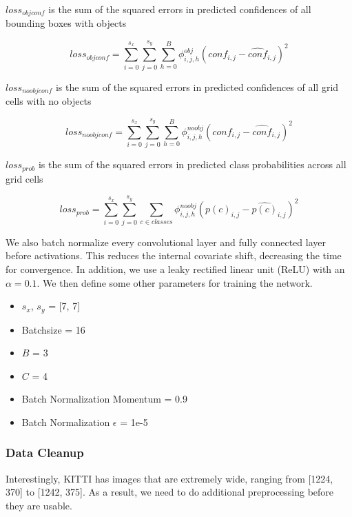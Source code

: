 \documentclass{article}
\begin{document}
$loss_{objconf}$ is the sum of the squared errors in predicted confidences of all bounding boxes with objects

\begin{equation}
loss_{objconf} = \sum\limits_{i=0}^{s_x}\sum\limits_{j=0}^{s_y}\sum\limits_{h=0}^{B}\phi_{i,j,h}^{obj}(conf_{i,j} - \hat{conf}_{i,j})^2
\end{equation}

$loss_{noobjconf}$ is the sum of the squared errors in predicted confidences of all grid cells with no objects

\begin{equation}
loss_{noobjconf} = \sum\limits_{i=0}^{s_x}\sum\limits_{j=0}^{s_y}\sum\limits_{h=0}^{B}\phi_{i,j,h}^{noobj}(conf_{i,j} - \hat{conf}_{i,j})^2
\end{equation}

$loss_{prob}$ is the sum of the squared errors in predicted class probabilities across all grid cells

\begin{equation}
loss_{prob} = \sum\limits_{i=0}^{s_x}\sum\limits_{j=0}^{s_y}\sum\limits_{c\in classes}^{}\phi_{i,j,h}^{noobj}(p(c)_{i,j} - \hat{p(c)}_{i,j})^2
\end{equation}

We also batch normalize every convolutional layer and fully connected layer before activations. This reduces the internal covariate shift, decreasing the time for convergence. In addition, we use a leaky rectified linear unit (ReLU) with an $\alpha = 0.1$. We then define some other parameters for training the network.

\begin{itemize}
  \item $s_x$, $s_y$ = [7, 7]
  \item Batchsize = 16
  \item $B$ = 3
  \item $C$ = 4
  \item Batch Normalization Momentum = 0.9
  \item Batch Normalization $\epsilon$ = 1e-5
\end{itemize}

\subsubsection{Data Cleanup}
Interestingly, KITTI has images that are extremely wide, ranging from [1224, 370] to [1242, 375]. As a result, we need to do additional preprocessing before they are usable.
\end{document}
